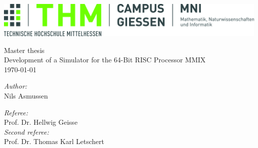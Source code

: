 \begin{titlepage}
\begin{center}

\includegraphics[width=\textwidth]{img/Logo_THM_CG_FB06_4c}\\
\vspace{6cm}

{\huge Master thesis}\\[1cm]
{\huge Development of a Simulator for the 64-Bit RISC Processor MMIX}\\[1cm]
{\large \today}

\vfill

\begin{minipage}{0.45\textwidth}
\begin{flushleft} \large
\emph{Author:}\\
Nils Asmussen\\
\vspace{1cm}
\end{flushleft}
\end{minipage}
\begin{minipage}{0.45\textwidth}
\begin{flushright} \large
\emph{Referee:}\\
Prof. Dr. Hellwig Geisse \\
\emph{Second referee:}\\
Prof. Dr. Thomas Karl Letschert

\end{flushright}
\end{minipage}

\end{center}
\end{titlepage}
